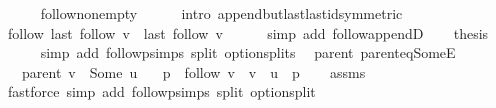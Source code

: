 \begin{isabellebody}
\ \ \ \ \isamarkupfalse%
\ follow{\isacharunderscore}{\kern0pt}non{\isacharunderscore}{\kern0pt}empty\isanewline
\ \ \ \ \isamarkupfalse%
\ {\isacharparenleft}{\kern0pt}intro\ append{\isacharunderscore}{\kern0pt}butlast{\isacharunderscore}{\kern0pt}last{\isacharunderscore}{\kern0pt}id{\isacharbrackleft}{\kern0pt}symmetric{\isacharbrackright}{\kern0pt}{\isacharparenright}{\kern0pt}\isanewline
\ \ \isamarkupfalse%
\ {\isachardoublequoteopen}follow\ {\isacharparenleft}{\kern0pt}last\ {\isacharparenleft}{\kern0pt}follow\ v{\isacharparenright}{\kern0pt}{\isacharparenright}{\kern0pt}\ {\isacharequal}{\kern0pt}\ {\isacharbrackleft}{\kern0pt}last\ {\isacharparenleft}{\kern0pt}follow\ v{\isacharparenright}{\kern0pt}{\isacharbrackright}{\kern0pt}{\isachardoublequoteclose}\isanewline
\ \ \ \ \isamarkupfalse%
\ {\isacharparenleft}{\kern0pt}simp\ add{\isacharcolon}{\kern0pt}\ follow{\isacharunderscore}{\kern0pt}appendD{\isacharparenright}{\kern0pt}\isanewline
\ \ \isamarkupfalse%
\ {\isacharquery}{\kern0pt}thesis\isanewline
\ \ \ \ \isamarkupfalse%
\ {\isacharparenleft}{\kern0pt}simp\ add{\isacharcolon}{\kern0pt}\ follow{\isacharunderscore}{\kern0pt}psimps\ split{\isacharcolon}{\kern0pt}\ option{\isachardot}{\kern0pt}splits{\isacharparenleft}{\kern0pt}{}{\isacharparenright}{\kern0pt}{\isacharparenright}{\kern0pt}\isanewline
{}\isamarkupfalse%
%
\endisatagproof
{\isafoldproof}%
%
\isadelimproof
\isanewline
%
\endisadelimproof
\isanewline
{}\isamarkupfalse%
\ {\isacharparenleft}{\kern0pt}\ parent{\isacharparenright}{\kern0pt}\ parent{\isacharunderscore}{\kern0pt}eq{\isacharunderscore}{\kern0pt}SomeE{\isacharcolon}{\kern0pt}\isanewline
\ \ \ {\isachardoublequoteopen}parent\ v\ {\isacharequal}{\kern0pt}\ Some\ u{\isachardoublequoteclose}\isanewline
\ \ \ p\ \ {\isachardoublequoteopen}follow\ v\ {\isacharequal}{\kern0pt}\ v\ {\isacharhash}{\kern0pt}\ u\ {\isacharhash}{\kern0pt}\ p{\isachardoublequoteclose}\isanewline
%
\isadelimproof
\ \ %
\endisadelimproof
%
\isatagproof
{}\isamarkupfalse%
\ assms\isanewline
\ \ \isamarkupfalse%
\ {\isacharparenleft}{\kern0pt}fastforce\ simp\ add{\isacharcolon}{\kern0pt}\ follow{\isacharunderscore}{\kern0pt}psimps\ split{\isacharcolon}{\kern0pt}\ option{\isachardot}{\kern0pt}split{\isacharparenright}{\kern0pt}%
\endisatagproof
{\isafoldproof}%
%
\isadelimproof
\isanewline
%
\endisadelimproof
\isanewline

\end{isabellebody}
